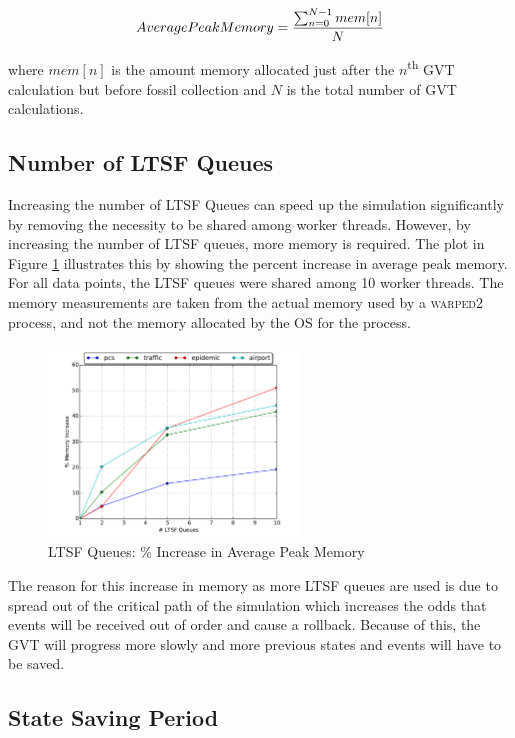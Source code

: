 \documentclass[11pt]{book}
\begin{document}
$$ Average Peak Memory = {\sum_{n=0}^{N-1} {mem[n]} \over N} $$

\noindent
where $mem[n]$ is the amount memory allocated just after the $n$\textsuperscript{th} GVT calculation
but before fossil collection and $N$ is the total number of GVT calculations.

\subsection{Number of LTSF Queues}

Increasing the number of LTSF Queues can speed up the simulation significantly by removing the
necessity to be shared among worker threads.  However, by increasing the number of LTSF queues, more
memory is required.  The plot in Figure \ref{ltsf_memory} illustrates this by showing the percent
increase in average peak memory.  For all data points, the LTSF queues were shared among 10 worker
threads.  The memory measurements are taken from the actual memory used by a \textsc{warped2}
process, and not the memory allocated by the OS for the process.

\begin{figure}
  \centering
  \includegraphics[width=0.6\textwidth,keepaspectratio,quiet]{figs/pending_event_set/ltsf_memory_increase.pdf}
  \caption{LTSF Queues: \% Increase in Average Peak Memory}\label{ltsf_memory}
\end{figure}

The reason for this increase in memory as more LTSF queues are used is due to spread out of the
critical path of the simulation which increases the odds that events will be received out of order
and cause a rollback.  Because of this, the GVT will progress more slowly and more previous states
and events will have to be saved.

\subsection{State Saving Period}
\end{document}
